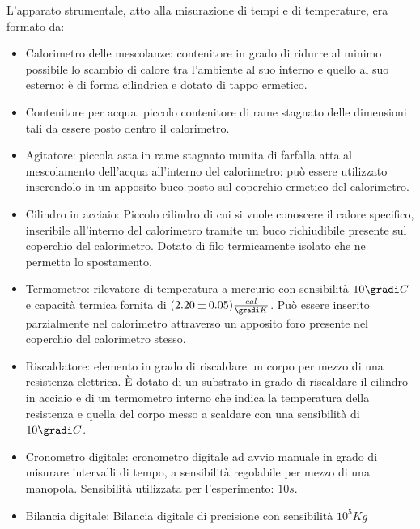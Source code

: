 L’apparato strumentale, atto alla misurazione di tempi e di temperature, era 
formato da:
\begin{itemize}
 \item Calorimetro delle mescolanze: contenitore in grado di ridurre al minimo 
possibile lo scambio di calore tra l’ambiente al suo interno
 e quello al suo esterno: è di forma cilindrica e dotato di tappo ermetico.
 \item Contenitore per acqua: piccolo contenitore di rame stagnato delle 
dimensioni tali da essere posto dentro il calorimetro.
 \item Agitatore: piccola asta in rame stagnato munita di farfalla atta al 
mescolamento dell’acqua all’interno del calorimetro: può essere
    utilizzato inserendolo in un apposito buco posto sul coperchio ermetico del 
calorimetro.
 \item Cilindro in acciaio: Piccolo cilindro di cui si vuole conoscere il 
calore specifico, inseribile all’interno del calorimetro tramite 
    un buco richiudibile presente sul coperchio del calorimetro. Dotato di filo 
termicamente isolato che ne permetta lo spostamento.
 \item Termometro: rilevatore di temperatura a mercurio con sensibilità $10
\gradi C$ e capacità termica fornita di 
 $ (2.20 \pm 0.05) \frac{cal} {\gradi K}$. 
    Può essere inserito parzialmente nel calorimetro attraverso un apposito 
foro presente nel coperchio del calorimetro stesso.
 \item Riscaldatore: elemento in grado di riscaldare un corpo per mezzo di una 
resistenza elettrica. È dotato di un substrato in grado di 
    riscaldare il cilindro in acciaio e di un termometro interno che indica la 
temperatura della resistenza e quella del corpo messo a 
    scaldare con una sensibilità di $10 \gradi C$.
 \item Cronometro digitale: cronometro digitale ad avvio manuale in grado di 
misurare intervalli di tempo, a sensibilità regolabile per 
    mezzo di una manopola. Sensibilità utilizzata per l’esperimento: $ 10 s$.
 \item Bilancia digitale: Bilancia digitale di precisione con sensibilità $10^5 
Kg$
\end{itemize}


